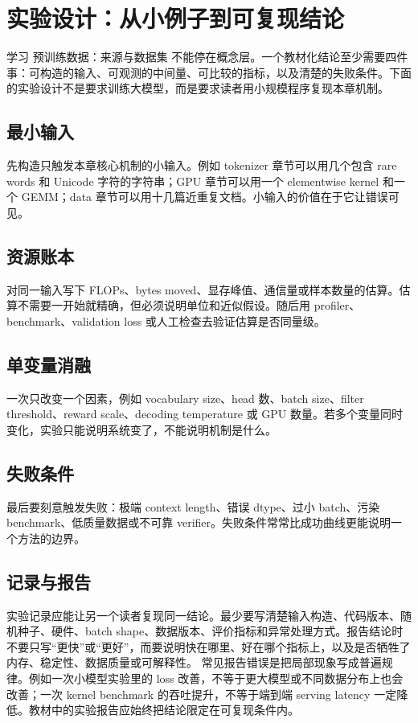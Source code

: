 \documentclass[a4paper]{article}
\begin{document}
\section{实验设计：从小例子到可复现结论}
学习 预训练数据：来源与数据集 不能停在概念层。一个教材化结论至少需要四件事：可构造的输入、可观测的中间量、可比较的指标，以及清楚的失败条件。下面的实验设计不是要求训练大模型，而是要求读者用小规模程序复现本章机制。
\subsection{最小输入}
先构造只触发本章核心机制的小输入。例如 tokenizer 章节可以用几个包含 rare words 和 Unicode 字符的字符串；GPU 章节可以用一个 elementwise kernel 和一个 GEMM；data 章节可以用十几篇近重复文档。小输入的价值在于它让错误可见。
\subsection{资源账本}
对同一输入写下 FLOPs、bytes moved、显存峰值、通信量或样本数量的估算。估算不需要一开始就精确，但必须说明单位和近似假设。随后用 profiler、benchmark、validation loss 或人工检查去验证估算是否同量级。
\subsection{单变量消融}
一次只改变一个因素，例如 vocabulary size、head 数、batch size、filter threshold、reward scale、decoding temperature 或 GPU 数量。若多个变量同时变化，实验只能说明系统变了，不能说明机制是什么。
\subsection{失败条件}
最后要刻意触发失败：极端 context length、错误 dtype、过小 batch、污染 benchmark、低质量数据或不可靠 verifier。失败条件常常比成功曲线更能说明一个方法的边界。
\subsection{记录与报告}
实验记录应能让另一个读者复现同一结论。最少要写清楚输入构造、代码版本、随机种子、硬件、batch shape、数据版本、评价指标和异常处理方式。报告结论时不要只写“更快”或“更好”，而要说明快在哪里、好在哪个指标上，以及是否牺牲了内存、稳定性、数据质量或可解释性。
常见报告错误是把局部现象写成普遍规律。例如一次小模型实验里的 loss 改善，不等于更大模型或不同数据分布上也会改善；一次 kernel benchmark 的吞吐提升，不等于端到端 serving latency 一定降低。教材中的实验报告应始终把结论限定在可复现条件内。
\end{document}
